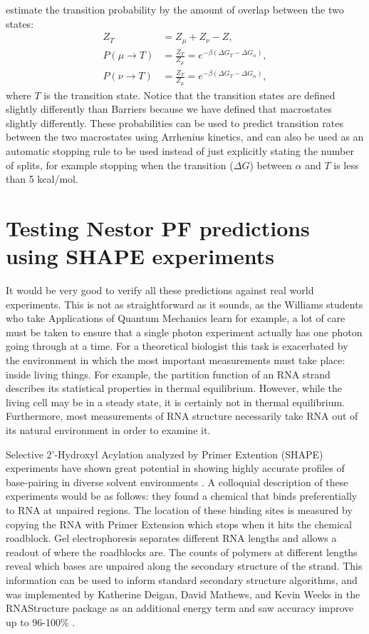 estimate the transition probability by the amount of overlap between
the two states:
\begin{align}
Z_{T} &= Z_\mu + Z_\nu - Z, \\
P( \mu \to T) &= \frac{Z_T}{Z_\mu} = e^{-\beta (\Delta G_T - \Delta G_\alpha)} , \\
P( \nu \to T) &= \frac{Z_T}{Z_\mu} = e^{-\beta (\Delta G_T - \Delta G_\alpha)},
\end{align}
where $T$ is the transition state. Notice that the transition states
are defined slightly differently than Barriers because we have defined
that macrostates slightly differently. These probabilities can be used
to predict transition rates between the two macrostates using
Arrhenius kinetics, and can also be used as an automatic stopping rule
to be used instead of just explicitly stating the number of splits, for
example stopping when the transition ($\Delta G$) between $\alpha$ and
$T$ is less than 5 kcal/mol.

\section{Testing Nestor PF predictions using SHAPE experiments}

It would be very good to verify all these predictions against real
world experiments.  This is not as straightforward as it sounds, as
the Williams students who take Applications of Quantum Mechanics learn
for example, a lot of care must be taken to ensure that a single
photon experiment actually has one photon going through at a time. For
a theoretical biologist this task is exacerbated by the environment
in which the most important measurements must take place: inside
living things. For example, the partition function of an RNA strand
describes its statistical properties in thermal equilibrium. However,
while the living cell may be in a steady state, it is certainly not in
thermal equilibrium. Furthermore, most measurements of RNA structure
necessarily take RNA out of its natural environment in order to
examine it.

Selective 2'-Hydroxyl Acylation analyzed by Primer Extention (SHAPE)
experiments have shown great potential in showing highly accurate
profiles of base-pairing in diverse solvent environments
\cite{wilkinson2006selective}. A colloquial description of these
experiments would be as follows: they found a chemical that binds
preferentially to RNA at unpaired regions. The location of these
binding sites is measured by copying the RNA with Primer Extension
which stops when it hits the chemical roadblock. Gel electrophoresis
separates different RNA lengths and allows a readout of where the
roadblocks are. The counts of polymers at different lengths reveal
which bases are unpaired along the secondary structure of the
strand. This information can be used to inform standard secondary
structure algorithms, and was implemented by Katherine Deigan, David
Mathews, and Kevin Weeks in the RNAStructure package as an additional
energy term and saw accuracy improve up to 96-100\%
\cite{deigan2008accurate}.

